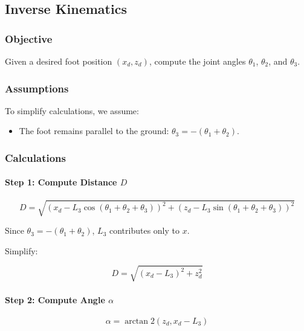 \documentclass{article}
\begin{document}
\subsection{Inverse Kinematics}

\subsubsection{Objective}

Given a desired foot position $(x_d, z_d)$, compute the joint angles $\theta_1$, $\theta_2$, and $\theta_3$.

\subsubsection{Assumptions}

To simplify calculations, we assume:

\begin{itemize}
    \item The foot remains parallel to the ground: $\theta_3 = -(\theta_1 + \theta_2)$.
\end{itemize}

\subsubsection{Calculations}

\paragraph{Step 1: Compute Distance $D$}

\begin{equation}
D = \sqrt{(x_d - L_3 \cos(\theta_1 + \theta_2 + \theta_3))^2 + (z_d - L_3 \sin(\theta_1 + \theta_2 + \theta_3))^2}
\end{equation}

Since $\theta_3 = -(\theta_1 + \theta_2)$, $L_3$ contributes only to $x$.

Simplify:

\begin{equation}
D = \sqrt{(x_d - L_3)^2 + z_d^2}
\end{equation}

\paragraph{Step 2: Compute Angle $\alpha$}

\begin{equation}
\alpha = \arctan2(z_d, x_d - L_3)
\end{equation}
\end{document}
